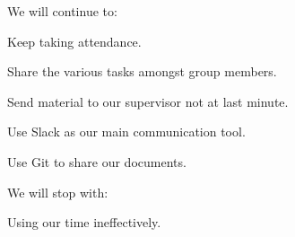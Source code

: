 \documentclass{article}
\begin{document}
We will continue to:
\begin{list}
\item Keep taking attendance.
\item Share the various tasks amongst group members.
\item Send material to our supervisor not at last minute.
\item Use Slack as our main communication tool.
\item Use Git to share our documents.
\end{list}

We will stop with:
\begin{list}
\item Using our time ineffectively.
\end{list}
\end{document}
